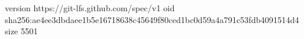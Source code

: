 version https://git-lfs.github.com/spec/v1
oid sha256:ae4ee3dbdaee1b5e16718638c45649f80ced1bc0d59a4a791c53fdb4091514d4
size 5501
